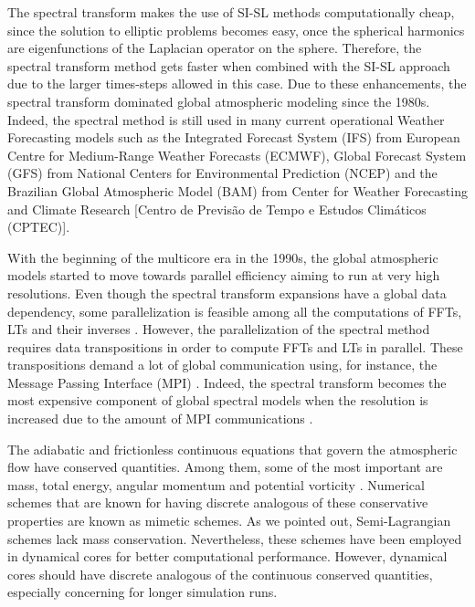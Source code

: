 The spectral transform makes the use of SI-SL methods computationally cheap, 
since the solution to elliptic problems becomes easy, once the spherical harmonics are
eigenfunctions of the Laplacian operator on the sphere.
Therefore, the spectral transform method gets faster when combined with the SI-SL approach
due to the larger times-steps allowed in this case.
Due to these enhancements, the spectral transform dominated global atmospheric modeling 
\citep{randall:2018} since the 1980s.
Indeed, the spectral method is still used in many current operational Weather Forecasting models such as
the Integrated Forecast System (IFS) from  European Centre for Medium-Range Weather Forecasts (ECMWF),
Global Forecast System (GFS) from National Centers for Environmental Prediction (NCEP) and the
Brazilian Global Atmospheric Model (BAM) \citep{figueroa:16} from  Center for Weather Forecasting 
and Climate Research [Centro de Previsão de Tempo e Estudos Climáticos (CPTEC)].

With the beginning of the multicore era in the 1990s, the global atmospheric models
started to move towards parallel efficiency aiming to run at very high resolutions. 
Even though the spectral transform expansions have a global data dependency, some parallelization
is feasible among all the computations of FFTs, LTs and their inverses \citep{barros:1995}.
However, the parallelization of the spectral method requires data transpositions in order
to compute FFTs and LTs in parallel.  
These transpositions demand a lot of global communication using, for instance,
the Message Passing Interface (MPI) \citep{zheng:2018}. 
Indeed, the spectral transform becomes the most expensive component of global spectral models
when the resolution is increased due to the amount of MPI communications \citep{mueller:2019}.

The adiabatic and frictionless continuous equations that govern the atmospheric flow have 
conserved quantities. Among them, some of the most important are mass, total energy, 
angular momentum and potential vorticity \citep{thuburn:2011}.
Numerical schemes that are known for having discrete analogous of these conservative properties
are known as mimetic schemes.
As we pointed out, Semi-Lagrangian schemes lack mass conservation. Nevertheless, 
these schemes have been employed in dynamical cores for better computational performance.
However, dynamical cores should have discrete analogous of the 
continuous conserved quantities, especially concerning for longer simulation runs.

